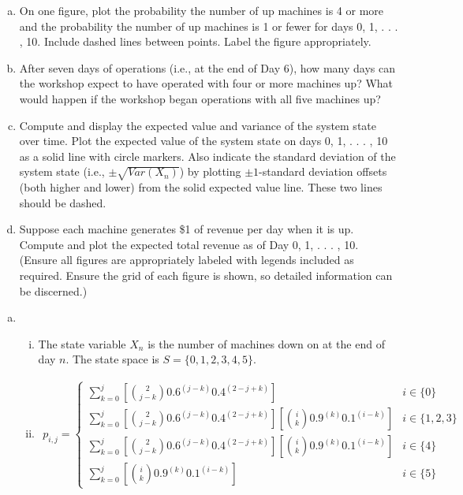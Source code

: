 \documentclass[answers]{exam}
\begin{document}
\begin{questions}
\begin{enumerate}[(a)]
	\item On one figure, plot the probability the number of up machines is 4 or more and the probability the number of up machines is 1 or fewer for days 0, 1, . . . , 10. Include dashed lines between points. Label the figure appropriately.
	
	\item After seven days of operations (i.e., at the end of Day 6), how many days can the workshop expect to have operated with four or more machines up? What would happen if the workshop began operations with all five machines up?
	
	\item Compute and display the expected value and variance of the system state over time. Plot the expected value of the system state on days 0, 1, . . . , 10 as a solid line with circle markers. Also indicate the standard deviation of the system state (i.e., \(\pm \sqrt{Var(X_n)}\)) by plotting \(\pm 1\)-standard deviation offsets (both higher and lower) from the solid expected value line. These two lines should be dashed.
	
	\item Suppose each machine generates \$1 of revenue per day when it is up. Compute and plot the expected total revenue as of Day 0, 1, . . . , 10.
	(Ensure all figures are appropriately labeled with legends included as required. Ensure the grid of each figure is shown, so detailed information can be discerned.)

\end{enumerate}
\begin{solution}
	\begin{enumerate}[(a)]
		\item 
		\begin{enumerate}[i.]
			\item 
			The state variable \(X_n\) is the number of machines down on at the end of day \(n\).
			The state space is \(S=\{0,1,2,3,4,5\}\).
			
			\item 
			\begin{align*}
				p_{i,j} =
				\begin{cases}
					\sum_{k=0}^{j} \left[\binom{2}{j-k}0.6^{(j-k)}0.4^{(2-j+k)}\right]
					& i \in \{0\} \\
					\sum_{k=0}^{j}  \left[\binom{2}{j-k}0.6^{(j-k)}0.4^{(2-j+k)}\right] \left[\binom{i}{k}0.9^{(k)}0.1^{(i-k)}\right]
					& i \in \{1,2,3\} \\
					\sum_{k=0}^{j}  \left[\binom{2}{j-k}0.6^{(j-k)}0.4^{(2-j+k)}\right] \left[\binom{i}{k}0.9^{(k)}0.1^{(i-k)}\right]
					& i \in \{4\} \\
					\sum_{k=0}^{j}  \left[\binom{i}{k}0.9^{(k)}0.1^{(i-k)}\right]
					& i \in \{5\}
				\end{cases}
			\end{align*}
			

\end{enumerate}
\end{enumerate}
\end{solution}
\end{questions}
\end{document}
